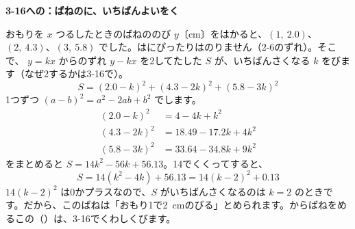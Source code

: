 \begin{motto}[3]
\textbf{3-16への：ばねのに、いちばんよいをく}\par
おもりを $x$ つるしたときのばねののび $y$〔cm〕をはかると、$(1,\ 2.0)$、$(2,\ 4.3)$、$(3,\ 5.8)$ でした。はにぴったりはのりません（2-6のずれ）。そこで、 $y=kx$ からのずれ $y-kx$ を2してたした $S$ が、いちばんさくなる $k$ をびます（なぜ2するかは3-16で）。
\[ S=(2.0-k)^2+(4.3-2k)^2+(5.8-3k)^2 \]
1つずつ $(a-b)^2=a^2-2ab+b^2$ でします。
\begin{align*}
(2.0-k)^2&=4-4k+k^2\\
(4.3-2k)^2&=18.49-17.2k+4k^2\\
(5.8-3k)^2&=33.64-34.8k+9k^2
\end{align*}
をまとめると $S=14k^2-56k+56.13$。14でくくってすると、
\[ S=14(k^2-4k)+56.13=14(k-2)^2+0.13 \]
$14(k-2)^2$ は0かプラスなので、$S$ がいちばんさくなるのは $k=2$ のときです。だから、このばねは「おもり1で\qty{2}{cm}のびる」とめられます。からばねをめるこの（）は、3-16でくわしくびます。
\end{motto}

